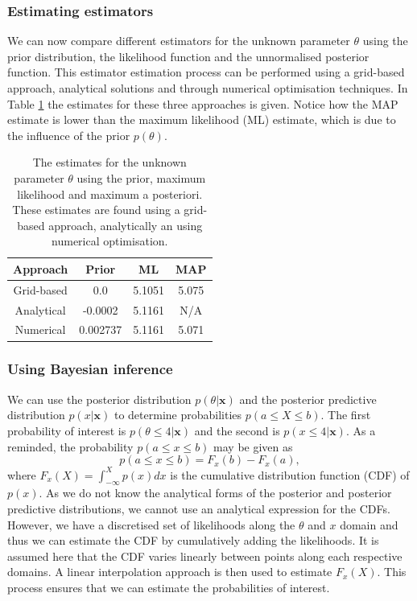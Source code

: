 \documentclass{article}
\begin{document}
\subsubsection{Estimating estimators}
We can now compare different estimators for the unknown parameter $\theta$ using the prior distribution, the likelihood function and the unnormalised posterior function. This estimator estimation process can be performed using a grid-based approach, analytical solutions and through numerical optimisation techniques. In Table \ref{tab:Q1_a} the estimates for these three approaches is given. Notice how the MAP estimate is lower than the maximum likelihood (ML) estimate, which is due to the influence of the prior $p(\theta)$.
\begin{table}[htb!]
\centering
\caption{The estimates for the unknown parameter $\theta$ using the prior, maximum likelihood and maximum a posteriori. These estimates are found using a grid-based approach, analytically an using numerical optimisation.}
\label{tab:Q1_a}
\begin{tabular}{@{}cccc@{}}
\toprule
Approach & Prior & ML & MAP \\ \midrule
Grid-based & 0.0 & 5.1051 & 5.075 \\
Analytical & -0.0002 & 5.1161 & N/A \\
Numerical & 0.002737 & 5.1161 & 5.071 \\ \bottomrule
\end{tabular}
\end{table}

\subsubsection{Using Bayesian inference}
We can use the posterior distribution $p(\theta \vert \mathbf{x})$ and the posterior predictive distribution $p(x \vert \mathbf{x})$ to determine probabilities $p(a \leq X \leq b)$. The first probability of interest is $p(\theta \leq 4 \vert \mathbf{x})$ and the second is $p(x \leq 4 \vert \mathbf{x})$. As a reminded, the probability $p(a \leq x \leq b)$ may be given as
\begin{equation}
p(a \leq x \leq b) = F_x(b) - F_x(a),
\end{equation}
where $F_x(X) = \int_{-\infty}^{X} p(x) dx$ is the cumulative distribution function (CDF) of $p(x)$. As we do not know the analytical forms of the posterior and posterior predictive distributions, we cannot use an analytical expression for the CDFs. However, we have a discretised set of likelihoods along the $\theta$ and $x$ domain and thus we can estimate the CDF by cumulatively adding the likelihoods. It is assumed here that the CDF varies linearly between points along each respective domains. A linear interpolation approach is then used to estimate $F_x(X)$. This process ensures that we can estimate the probabilities of interest.
\end{document}
